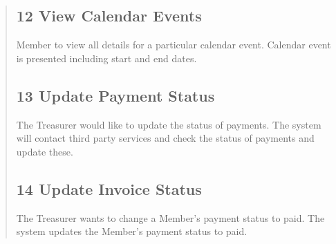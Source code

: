 \begin{quote}
\subsection{12 View Calendar Events}\label{view-calendar-events}

Member to view all details for a particular calendar event. Calendar
event is presented including start and end dates.

\subsection{13 Update Payment Status}\label{update-payment-status}

The Treasurer would like to update the status of payments. The system
will contact third party services and check the status of payments and
update these.

\subsection{14 Update Invoice Status}\label{update-invoice-status}

The Treasurer wants to change a Member's payment status to paid. The
system updates the Member's payment status to paid.



\end{quote}

